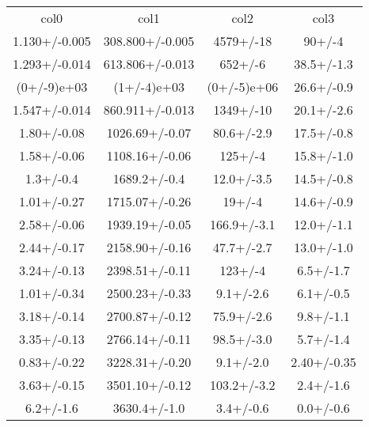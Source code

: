 \begin{table}
\begin{tabular}{cccc}
col0 & col1 & col2 & col3 \\
1.130+/-0.005 & 308.800+/-0.005 & 4579+/-18 & 90+/-4 \\
1.293+/-0.014 & 613.806+/-0.013 & 652+/-6 & 38.5+/-1.3 \\
(0+/-9)e+03 & (1+/-4)e+03 & (0+/-5)e+06 & 26.6+/-0.9 \\
1.547+/-0.014 & 860.911+/-0.013 & 1349+/-10 & 20.1+/-2.6 \\
1.80+/-0.08 & 1026.69+/-0.07 & 80.6+/-2.9 & 17.5+/-0.8 \\
1.58+/-0.06 & 1108.16+/-0.06 & 125+/-4 & 15.8+/-1.0 \\
1.3+/-0.4 & 1689.2+/-0.4 & 12.0+/-3.5 & 14.5+/-0.8 \\
1.01+/-0.27 & 1715.07+/-0.26 & 19+/-4 & 14.6+/-0.9 \\
2.58+/-0.06 & 1939.19+/-0.05 & 166.9+/-3.1 & 12.0+/-1.1 \\
2.44+/-0.17 & 2158.90+/-0.16 & 47.7+/-2.7 & 13.0+/-1.0 \\
3.24+/-0.13 & 2398.51+/-0.11 & 123+/-4 & 6.5+/-1.7 \\
1.01+/-0.34 & 2500.23+/-0.33 & 9.1+/-2.6 & 6.1+/-0.5 \\
3.18+/-0.14 & 2700.87+/-0.12 & 75.9+/-2.6 & 9.8+/-1.1 \\
3.35+/-0.13 & 2766.14+/-0.11 & 98.5+/-3.0 & 5.7+/-1.4 \\
0.83+/-0.22 & 3228.31+/-0.20 & 9.1+/-2.0 & 2.40+/-0.35 \\
3.63+/-0.15 & 3501.10+/-0.12 & 103.2+/-3.2 & 2.4+/-1.6 \\
6.2+/-1.6 & 3630.4+/-1.0 & 3.4+/-0.6 & 0.0+/-0.6 \\
\end{tabular}
\end{table}
